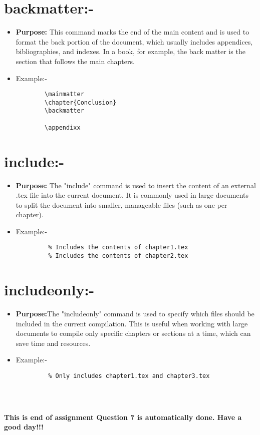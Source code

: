 \section{backmatter:- }
\begin{itemize}
    \item \textbf{Purpose:} This command marks the end of the main content and is used to format the back portion of the document, which usually includes appendices, bibliographies, and indexes. In a book, for example, the back matter is the section that follows the main chapters.
    \item Example:-
    \begin{verbatim}
        \mainmatter
        \chapter{Conclusion}
        \backmatter
        
        \appendixx
    \end{verbatim}
\end{itemize}


\section{include:- }
\begin{itemize}
    \item \textbf{Purpose:} The "include" command is used to insert the content of an external .tex file into the current document. It is commonly used in large documents to split the document into smaller, manageable files (such as one per chapter).
    \item Example:-
    \begin{verbatim}
         % Includes the contents of chapter1.tex
         % Includes the contents of chapter2.tex
    \end{verbatim}
\end{itemize}



\section{includeonly:- }
\begin{itemize}
    \item \textbf{Purpose:}The "includeonly" command is used to specify which files should be included in the current compilation. This is useful when working with large documents to compile only specific chapters or sections at a time, which can save time and resources.
    \item Example:-
    \begin{verbatim}
         % Only includes chapter1.tex and chapter3.tex
        
        
        
    \end{verbatim}
\end{itemize}

\vspace{2cm}
\centering
\textbf{This is end of assignment Question 7 is automatically done. Have a good day!!!}